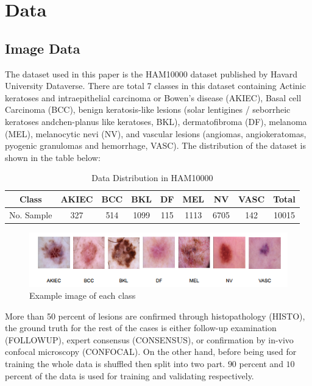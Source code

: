 \section{Data}
\subsection{Image Data}
The dataset used in this paper is the HAM10000 dataset published by Havard University Dataverse\cite{10417}. There are total 7 classes in this dataset containing Actinic keratoses and intraepithelial carcinoma or Bowen's disease (AKIEC), Basal cell Carcinoma (BCC),  benign keratosis-like lesions (solar lentigines / seborrheic keratoses andchen-planus like keratoses, BKL), dermatofibroma (DF), melanoma (MEL), melanocytic nevi (NV), and vascular lesions (angiomas, angiokeratomas, pyogenic granulomas and hemorrhage, VASC). The distribution of the dataset is shown in the table below:
\begin{table}
	\centering
	\begin{tabular}{|c c c c c c c c c|} 
		\hline
		Class & AKIEC & BCC & BKL & DF & MEL & NV & VASC & Total \\ 
		\hline
		No. Sample & 327 & 514 & 1099 & 115 & 1113 & 6705 & 142 & 10015 \\
		\hline
	\end{tabular}
	\caption{Data Distribution in HAM10000}
	\label{table:1}
\end{table}
\begin{figure}[h]
	\centering
	\includegraphics[width=1\linewidth]{img/DataDistribution}
	\caption{Example image of each class}
	\label{fig:datadistribution}
\end{figure}
More than 50 percent of lesions are confirmed through histopathology (HISTO), the ground truth for the rest of the cases is either follow-up examination (FOLLOWUP), expert consensus (CONSENSUS), or confirmation by in-vivo confocal microscopy (CONFOCAL). On the other hand, before being used for training the whole data is shuffled then split into two part. $90$ percent and $10$ percent of the data is used for training and validating respectively.\\
